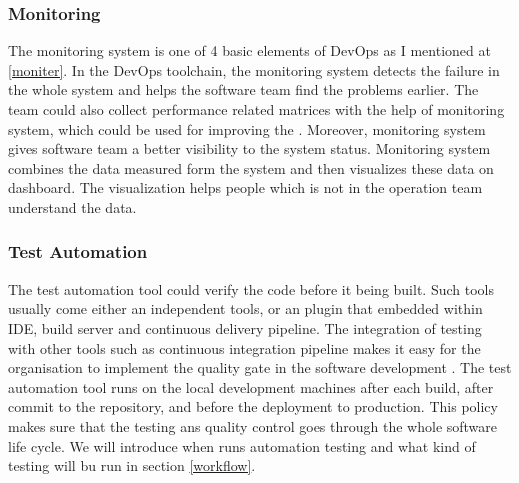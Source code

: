 \subsubsection{Monitoring}
The monitoring system is one of 4 basic elements of DevOps as I mentioned at \ref{moniter}. In the DevOps toolchain, the monitoring system detects the failure in the whole system and helps the software team find the problems earlier. The team could also collect performance related matrices with the help of monitoring system, which could be used for improving the . Moreover, monitoring system gives software team a better visibility to the system status. Monitoring system combines the data measured form the system and then visualizes these data on dashboard. The visualization helps people which is not in the operation team understand the data.
\subsubsection{Test Automation}
The test automation tool could verify the code before it being built. Such tools usually come either an independent tools, or an plugin that embedded within IDE, build server and continuous delivery pipeline. The integration of testing with other tools such as continuous integration pipeline makes it easy for the organisation to implement the quality gate in the software development \cite{huttermann2012devops}.
The test automation tool runs on the local development machines after each build, after commit to the repository, and before the deployment to production. This policy makes sure that the testing ans quality control goes through the whole software life cycle. We will introduce when runs automation testing and what kind of testing will bu run in section \ref{workflow}. 
